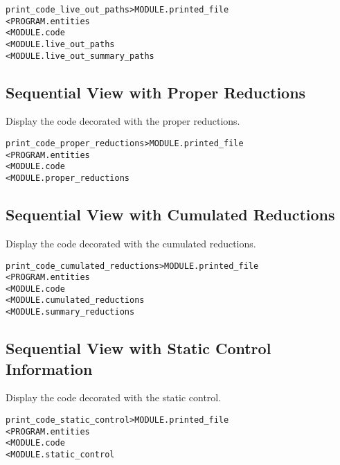 \documentclass[a4paper]{report}
\newenvironment{PipsMake}{\begin{alltt}}{\end{alltt}}
\newenvironment{PipsPass}[1]{\label{pass:#1}}{}
\begin{document}
\begin{PipsMake}
print_code_live_out_paths    > MODULE.printed_file
        < PROGRAM.entities
        < MODULE.code
        < MODULE.live_out_paths
        < MODULE.live_out_summary_paths
\end{PipsMake}


\subsection{Sequential View with Proper Reductions}

\begin{PipsPass}{print_code_proper_reductions}
Display the code decorated with the proper reductions.
\end{PipsPass}

\begin{PipsMake}
print_code_proper_reductions > MODULE.printed_file
  < PROGRAM.entities
  < MODULE.code
  < MODULE.proper_reductions
\end{PipsMake}

\subsection{Sequential View with Cumulated Reductions}

\begin{PipsPass}{print_code_cumulated_reductions}
Display the code decorated with the cumulated reductions.
\end{PipsPass}

\begin{PipsMake}
print_code_cumulated_reductions > MODULE.printed_file
  < PROGRAM.entities
  < MODULE.code
  < MODULE.cumulated_reductions
  < MODULE.summary_reductions
\end{PipsMake}


\subsection{Sequential View with Static Control Information}

\begin{PipsPass}{print_code_static_control}
Display the code decorated with the static control.
\end{PipsPass}

\begin{PipsMake}
print_code_static_control       > MODULE.printed_file
        < PROGRAM.entities
        < MODULE.code
        < MODULE.static_control
\end{PipsMake}
\end{document}
